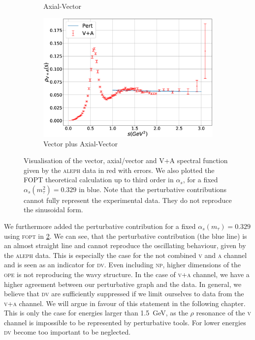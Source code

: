 \documentclass[../../index.tex]{subfiles}
\begin{document}
\begin{figure}
\begin{subfigure}[b]{0.49\textwidth}
    \caption{Axial-Vector}
    \label{fig:alephA}
  \end{subfigure}
  \begin{subfigure}[b]{\textwidth}
    \centering
    \includegraphics[width=\textwidth]{./images/specFuncAleph_VpA.eps}
    \caption{Vector plus Axial-Vector}
    \label{fig:alephVPlusA}
  \end{subfigure}
  \caption{Visualisation of the vector, axial\-/vector and V+A spectral function
    given by the \textsc{aleph} data \cite{Davier2013} in red with errors. We
    also plotted the \textsc{FOPT} theoretical calculation up to third order in
    \(\alpha_s\), for a fixed \(\alpha_s(m_\tau^2)=0.329\) in blue. Note that
    the perturbative contributions cannot fully represent the experimental data.
    They do not reproduce the sinusoidal form.}
  \label{fig:aleph}
\end{figure}

We furthermore added the perturbative contribution for a fixed
\(\alpha_s(m_\tau)=0.329\) using \textsc{fopt} in \cref{fig:alephVPlusA}. We can
see, that the perturbative contribution (the blue line) is an almost straight
line and cannot reproduce the oscillating behaviour, given by the \textsc{aleph}
data. This is especially the case for the not combined \textsc{v} and \textsc{a}
channel and is seen as an indicator for \textsc{dv}. Even including \textsc{np},
higher dimensions of the \textsc{ope} is not reproducing the wavy structure. In
the case of \textsc{v+a} channel, we have a higher agreement between our
perturbative graph and the data. In general, we believe that \textsc{dv} are
sufficiently suppressed if we limit ourselves to data from the \textsc{v+a}
channel. We will argue in favour of this statement in the following chapter.
This is only the case for energies larger than \SI{1.5}{\giga\eV}, as the
\(\rho\) resonance of the \textsc{v} channel is impossible to be represented by
perturbative tools. For lower energies \textsc{dv} become too important to be
neglected.
\end{document}
